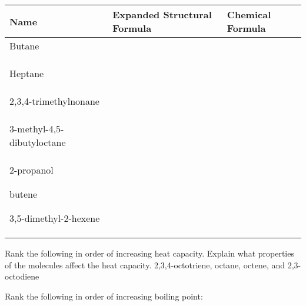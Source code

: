 \documentclass[addpoints, 12pt]{exam}
\begin{document}
\begin{questions}
\begin{tabular}{l|l|l}
Name & Expanded Structural Formula & Chemical Formula \\
\hline
Butane & & \\
 & & \\
 & & \\
 & & \\
\hline
Heptane & & \\
& & \\ & & \\ & & \\ \hline
2,3,4-trimethylnonane & & \\
& & \\ & & \\ & & \\ \hline
3-methyl-4,5-dibutyloctane & & \\
& & \\ & & \\ & & \\ \hline
2-propanol
& & \\ & & \\ & & \\ \hline
butene
& & \\ & & \\ & & \\ \hline
3,5-dimethyl-2-hexene & & \\
& & \\ & & \\ & & \\ \hline
\end{tabular}


\question[5] Rank the following in order of increasing heat capacity.
Explain what properties of the molecules affect the heat capacity.
2,3,4-octotriene, octane, octene, and 2,3-octodiene

\vspace{1cm}

\question[10] Rank the following in order of increasing boiling point:
\vspace{1cm}



\end{questions}
\end{document}
